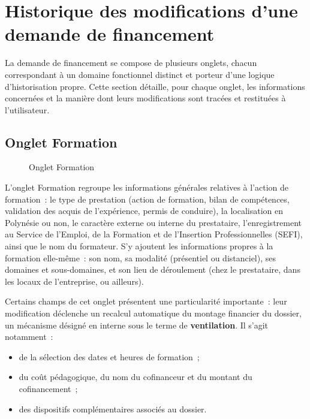 \section{Historique des modifications d'une demande de financement}
\label{sec:historisation-par-onglet}

La demande de financement se compose de plusieurs onglets, chacun
correspondant à un domaine fonctionnel distinct et porteur d'une logique
d'historisation propre. Cette section détaille, pour chaque onglet, les
informations concernées et la manière dont leurs modifications sont
tracées et restituées à l'utilisateur.

\subsection{Onglet Formation}

\begin{figure}[H]
  \centering
  \caption{Onglet Formation}
  \label{fig:onglet-formation}
\end{figure}

L'onglet Formation regroupe les informations générales relatives à
l'action de formation~: le type de prestation (action de formation,
bilan de compétences, validation des acquis de l'expérience, permis de
conduire), la localisation en Polynésie ou non, le caractère externe ou
interne du prestataire, l'enregistrement au Service de l'Emploi, de la
Formation et de l'Insertion Professionnelles (SEFI), ainsi que le nom du
formateur. S'y ajoutent les informations propres à la formation
elle-même~: son nom, sa modalité (présentiel ou distanciel), ses
domaines et sous-domaines, et son lieu de déroulement (chez le
prestataire, dans les locaux de l'entreprise, ou ailleurs).

Certains champs de cet onglet présentent une particularité importante~:
leur modification déclenche un recalcul automatique du montage financier
du dossier, un mécanisme désigné en interne sous le terme de
\textbf{ventilation}. Il s'agit notamment~:

\begin{itemize}
  \item de la sélection des dates et heures de formation~;
  \item du coût pédagogique, du nom du cofinanceur et du montant du
        cofinancement~;
  \item des dispositifs complémentaires associés au dossier.
\end{itemize}

